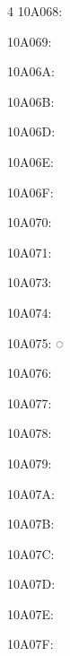 \begin{multicols}{4}
10A068: 􊁨

10A069: 􊁩

10A06A: 􊁪

10A06B: 􊁫

10A06D: 􊁭

10A06E: 􊁮

10A06F: 􊁯

10A070: 􊁰

10A071: 􊁱

10A073: 􊁳

10A074: 􊁴

10A075: ◌􊁵

10A076: 􊁶

10A077: 􊁷

10A078: 􊁸

10A079: 􊁹

10A07A: 􊁺

10A07B: 􊁻

10A07C: 􊁼

10A07D: 􊁽

10A07E: 􊁾

10A07F: 􊁿
\end{multicols}
